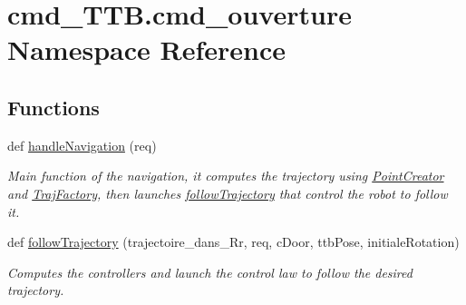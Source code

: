 \hypertarget{namespacecmd__TTB_1_1cmd__ouverture}{}\section{cmd\+\_\+\+T\+T\+B.\+cmd\+\_\+ouverture Namespace Reference}
\label{namespacecmd__TTB_1_1cmd__ouverture}
\subsection*{Functions}
\begin{DoxyCompactItemize}
\item 
def \hyperlink{namespacecmd__TTB_1_1cmd__ouverture_a69046dc4c4b699caef9e459f6620a389}{handle\+Navigation} (req)
\begin{DoxyCompactList}\small\item\em Main function of the navigation, it computes the trajectory using \hyperlink{classPointCreator}{Point\+Creator} and \hyperlink{classTrajFactory}{Traj\+Factory}, then launches \hyperlink{namespacecmd__TTB_1_1cmd__ouverture_a265af166b80f6b0fd2414926197bd440}{follow\+Trajectory} that control the robot to follow it. \end{DoxyCompactList}\item 
def \hyperlink{namespacecmd__TTB_1_1cmd__ouverture_a265af166b80f6b0fd2414926197bd440}{follow\+Trajectory} (trajectoire\+\_\+dans\+\_\+\+Rr, req, c\+Door, ttb\+Pose, initiale\+Rotation)
\begin{DoxyCompactList}\small\item\em Computes the controllers and launch the control law to follow the desired trajectory. \end{DoxyCompactList}\end{DoxyCompactItemize}
